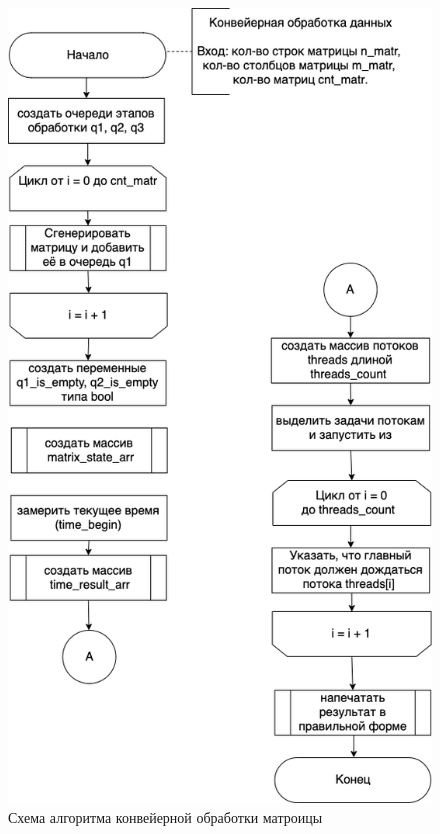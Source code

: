 \clearpage

\begin{figure}[h]
	\centering
	\includegraphics[scale=0.6]{img/parallel_processing.png}
	\caption{Схема алгоритма конвейерной обработки матроицы}
	\label{fig:parallel_processing}
\end{figure}

\clearpage

